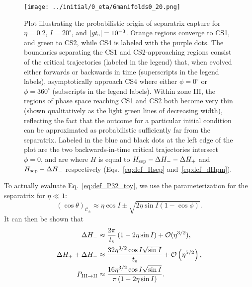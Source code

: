 \documentclass[
        fleqn,
        usenatbib,
    ]{mnras}
\newcommand*{\abs}[1]{\left|#1\right|}
\newcommand*{\p}[1]{\left(#1\right)}
\begin{document}
\begin{figure}
    \centering
    \texttt{[image: ../initial/0\_eta/6manifolds0\_20.png]}
    \caption{Plot illustrating the probabilistic origin of separatrix capture
    for $\eta = 0.2$, $I = 20^\circ$, and $\abs{gt_{\rm s}} = 10^{-3}$. Orange
    regions converge to CS1, and green to CS2, while CS4 is labeled with the
    purple dots. The boundaries separating the CS1 and CS2-approaching regions
    consist of the critical trajectories (labeled in the legend) that, when
    evolved either forwards or backwards in time (superscripts in the legend
    labels), asymptotically approach CS4 where either $\phi = 0^\circ$ or $\phi
    = 360^\circ$ (subscripts in the legend labels). Within zone III, the regions
    of phase space reaching CS1 and CS2 both become very thin (shown
    qualitatively as the light green lines of decreasing width), reflecting the
    fact that the outcome for a particular initial condition can be approximated
    as probabilistic sufficiently far from the separatrix. Labeled in the blue
    and black dots at the left edge of the plot are the two backwards-in-time
    critical trajectories intersect $\phi = 0$, and are where $H$ is equal to
    $H_{\rm sep} - \Delta H_- - \Delta H_+$ and $H_{\rm sep} - \Delta H_-$
    respectively (Eqs.~\ref{eq:def_Hsep} and~\ref{eq:def_dHpm}).
    }\label{fig:toy_hop_manifolds}
\end{figure}

To actually evaluate Eq.~\eqref{eq:def_P32_toy}, we use the parameterization for
the separatrix \citep{su2020} for $\eta \ll 1$:
\begin{equation}
    \p{\cos \theta}_{\mathcal{C}_{\pm}} \approx
        \eta \cos I \pm \sqrt{2\eta\sin I\p{1 - \cos \phi}}.
        \label{eq:sep_theta}
\end{equation}
It can then be shown that
\begin{align}
    \Delta H_- &\approx \frac{2\pi}{t_{\rm s}}\p{1
        - 2\eta \sin I} + \mathcal{O}(\eta^{3/2}),\\
    \Delta H_+ + \Delta H_- &\approx
        \frac{32 \eta^{3/2}\cos I \sqrt{\sin I}}{t_{\rm s}}
            + \mathcal{O}\p{\eta^{5/2}},\\
    P_{\rm III \to II} &\approx
        \frac{16 \eta^{3/2} \cos I \sqrt{\sin I}}{\pi
            \p{1  - 2\eta \sin I}}.\label{eq:P32_toy}
\end{align}
\end{document}
